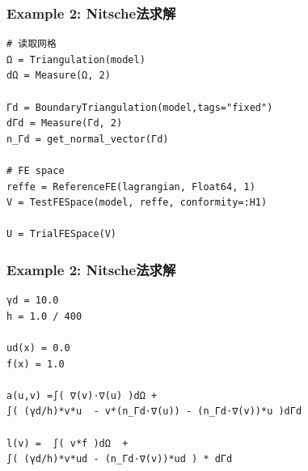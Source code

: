 \documentclass[lang=en,aspectratio=43,theme=default,logo=on]{simplebeamer}
\begin{document}
\begin{frame}[fragile]
    \frametitle{Example 2: Nitsche法求解}
    \begin{verbatim}
# 读取网格
Ω = Triangulation(model)
dΩ = Measure(Ω, 2)

Γd = BoundaryTriangulation(model,tags="fixed")
dΓd = Measure(Γd, 2)
n_Γd = get_normal_vector(Γd)

# FE space
reffe = ReferenceFE(lagrangian, Float64, 1)
V = TestFESpace(model, reffe, conformity=:H1)

U = TrialFESpace(V)
    \end{verbatim}
\end{frame}

\begin{frame}[fragile]
    \frametitle{Example 2: Nitsche法求解}
    \begin{verbatim}
γd = 10.0
h = 1.0 / 400

ud(x) = 0.0
f(x) = 1.0

a(u,v) =∫( ∇(v)⋅∇(u) )dΩ +
∫( (γd/h)*v*u  - v*(n_Γd⋅∇(u)) - (n_Γd⋅∇(v))*u )dΓd

l(v) =  ∫( v*f )dΩ  +
∫( (γd/h)*v*ud - (n_Γd⋅∇(v))*ud ) * dΓd
    \end{verbatim}
\end{frame}
\end{document}
